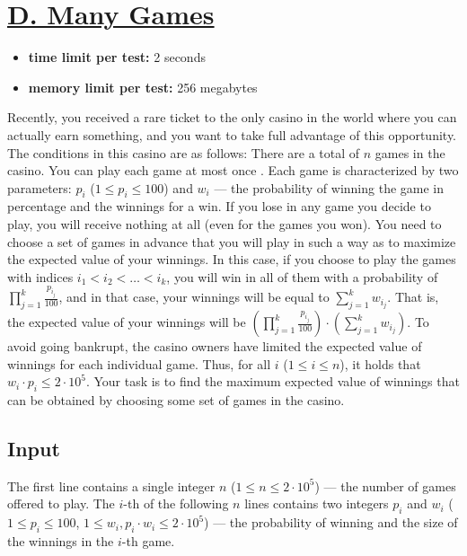 \documentclass{article}
\begin{document}
\section{\href{https://codeforces.com/problemset/problem/2023/D}{D. Many Games}}

\begin{itemize}
\item \textbf{time limit per test:} 2 seconds
\item \textbf{memory limit per test:} 256 megabytes
\end{itemize}
Recently, you received a rare ticket to the only casino in the world where you can actually earn something, and you want to take full advantage of this opportunity. The conditions in this casino are as follows: There are a total of $n$ games in the casino. You can play each game at most once . Each game is characterized by two parameters: $p_i$ ($1 \le p_i \le 100$) and $w_i$ — the probability of winning the game in percentage and the winnings for a win. If you lose in any game you decide to play, you will receive nothing at all (even for the games you won). You need to choose a set of games in advance that you will play in such a way as to maximize the expected value of your winnings. In this case, if you choose to play the games with indices $i_1 < i_2 < \ldots < i_k$, you will win in all of them with a probability of $\prod\limits_{j=1}^k \frac{p_{i_j}}{100}$, and in that case, your winnings will be equal to $\sum\limits_{j=1}^k w_{i_j}$. That is, the expected value of your winnings will be $\left(\prod\limits_{j=1}^k \frac{p_{i_j}}{100}\right) \cdot \left(\sum\limits_{j=1}^k w_{i_j}\right)$. To avoid going bankrupt, the casino owners have limited the expected value of winnings for each individual game. Thus, for all $i$ ($1 \le i \le n$), it holds that $w_i \cdot p_i \le 2 \cdot 10^5$. Your task is to find the maximum expected value of winnings that can be obtained by choosing some set of games in the casino.

\subsection*{Input}
 The first line contains a single integer $n$ ($1 \le n \le 2 \cdot 10^5$) — the number of games offered to play. The $i$-th of the following $n$ lines contains two integers $p_i$ and $w_i$ ($1 \leq p_i \leq 100$, $1 \leq w_i, p_i \cdot w_i \leq 2 \cdot 10^5$) — the probability of winning and the size of the winnings in the $i$-th game.
\end{document}
